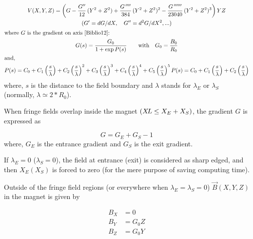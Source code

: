 \begin{gather*}
 	V(X,Y,Z)     =   \left(G- \dfrac{G^{\prime\prime} }{ 12}\, (Y^2+Z^2)+
	             \dfrac{G^{\quaprime} }{ 384}\, (Y^2+Z^2)^2-
	             \dfrac{G^{\cinqprime\prime} }{ 23040}\, (Y^2+Z^2)^3 \right)YZ  \\
	(G^\prime     =    dG/dX,\quad G^{\prime\prime} =d^2G/dX^2,...) \\
\intertext{where $ G $ is the gradient on axis~\protect\cite{Biblio12}:  } %
    G(s) = \dfrac{G_0 }{ 1+ \exp  P(s)}\qquad \text{with} \quad G_0=\dfrac{B_0}{R_0} \\
\intertext{and,}
     P(s) = C_0
       +C_1 \left(  \dfrac{s }{ \lambda} \right) 
       +C_2 \left( \dfrac{s }{ \lambda} \right)^2 
       + C_3 \left( \dfrac{s }{ \lambda} \right)^3 
       +C_4 \left( \dfrac{s }{ \lambda} \right)^4 
       + C_5 \left(\dfrac{s }{ \lambda} \right)^5
       P(s)=C_0+C_1 \left(\dfrac{s }{ \lambda} \right) + C_2 \left(\dfrac{s }{ \lambda}\right)
\end{gather*}
%
 where, $ s $ is the distance to the field boundary and $\lambda$
stands for $ \lambda_ E $ or $ \lambda_ S $ 
(normally, $ \lambda  \simeq  2  \ast  R_0$). 

\noindent When fringe fields overlap inside the magnet $ (X\!L\leq X_E+X_S)$,  
the gradient $ G $ is expressed as 

$$ G = G_E+G_S-1 $$
%
where, $ G_E $ is the entrance gradient and $ G_S $ is the exit gradient. 

\noindent If $ \lambda_ E=0$ ($\lambda_ S=0$),  the field at entrance 
(exit) is considered as sharp edged, and then $ X_E(X_S) $ is forced to zero 
(for the mere purpose of saving computing time). 

\noindent Outside of the fringe field regions (or everywhere when 
$ \lambda_E=\lambda_ S=0$)   $ \vec  B(X,Y,Z) $ in the magnet is given by 

\begin{align*}
	B_X &   =     0 \\
	B_Y &   =    G_0Z \\
	B_Z &   =     G_0Y  
\end{align*}

\newpage

